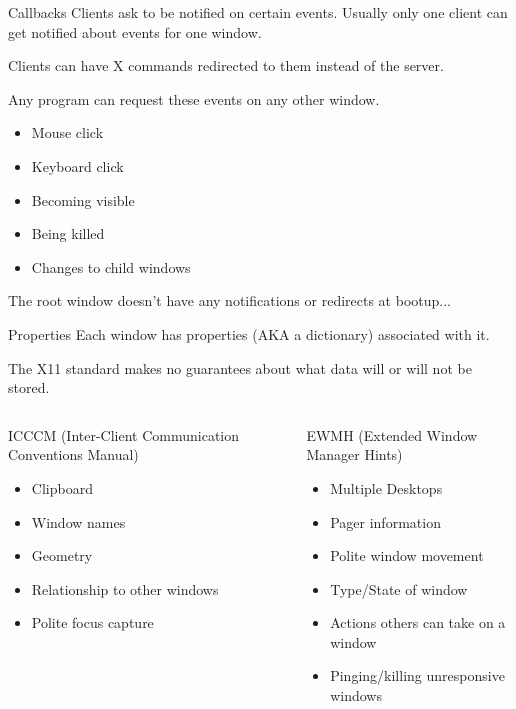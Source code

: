 \documentclass[10pt]{beamer}
\begin{document}
\begin{frame}{Callbacks}
  Clients ask to be notified on certain events. Usually only one client can
  get notified about events for one window.

  Clients can have X commands redirected to them instead of the server.

  \pause
  Any program can request these events on any other window.

  \onslide<+->
  \begin{itemize}[<+->]
    \item Mouse click
    \item Keyboard click
    \item Becoming visible
    \item Being killed
    \item Changes to child windows
  \end{itemize}

  \onslide<+->
  The root window doesn't have any notifications or redirects at bootup...
\end{frame}
\begin{frame}{Properties}
  Each window has properties (AKA a dictionary) associated with it.

  \pause
  The X11 standard makes no guarantees about what data will or will not be
  stored.

  \pause
  \begin{columns}[T]
    \begin{column}{.48\textwidth}
      ICCCM (Inter-Client Communication Conventions Manual)
      \begin{itemize}
        \item Clipboard
        \item Window names
        \item Geometry
        \item Relationship to other windows
        \item Polite focus capture
      \end{itemize}
    \end{column}
    \begin{column}{.48\textwidth}
      \pause
      EWMH (Extended Window Manager Hints)
      \begin{itemize}
        \item Multiple Desktops
        \item Pager information
        \item Polite window movement
        \item Type/State of window
        \item Actions others can take on a window
        \item Pinging/killing unresponsive windows
      \end{itemize}
    \end{column}
  \end{columns}
\end{frame}
\end{document}
